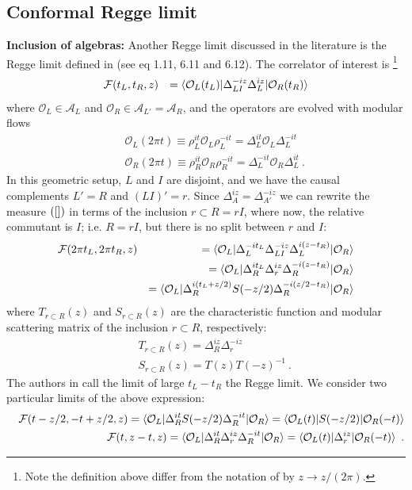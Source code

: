 \documentclass[a4paper,11pt]{article}
\theoremstyle{definition}
\newcommand{\mA}{\mathcal{A}}
\newcommand{\nn}{\nonumber}
\newcommand{\mO}{\mathcal{O}}
\begin{document}
\subsection{Conformal Regge limit}

{\bf Inclusion of algebras:} Another Regge limit discussed in the literature is the Regge limit defined in \cite{chandrasekaran2022scattering} (see eq 1.11, 6.11 and 6.12). The correlator of interest is \footnote{Note the definition above differ from the notation of \cite{chandrasekaran2022scattering} by $z\to z/(2\pi)$.}
\begin{eqnarray}
    \mathcal{F}(t_L,t_R,z)&&=\braket{\mO_L(t_L)|\Delta_{LI}^{-iz}\Delta_L^{iz}|\mO_R(t_R)}
\end{eqnarray}
where $\mO_L\in \mA_L$ and $\mO_R\in \mA_{L'}=\mA_R$, and the operators are evolved with modular flows
\begin{eqnarray}
    &&\mO_L(2\pi t)\equiv \rho_L^{it}\mO_L \rho_L^{-it}=\Delta_L^{it}\mO_L \Delta_L^{-it}\nn\\
    &&\mO_R(2\pi t)\equiv \rho_R^{it}\mO_R \rho_R^{-it}=\Delta_L^{-it}\mO_R \Delta_L^{it}\ .
\end{eqnarray}
In this geometric setup, $L$ and $I$ are disjoint, and we have the causal complements $L'=R$ and $(LI)'=r$. Since $\Delta_A^{iz}=\Delta_{A'}^{-iz}$ we can rewrite the measure $(\ref{})$ in terms of the inclusion $r\subset R=r I$, where now, the relative commutant is $I$; i.e. $R=r I$, but there is no split between $r$ and $I$:
\begin{eqnarray}
    \mathcal{F}(2\pi t_L,2\pi t_R,z)&&=\braket{\mO_L| \Delta_L^{-i t_L}\Delta_{LI}^{-iz}\Delta_L^{i(z-t_R)}|\mO_R}\nn\\
    &&=\braket{\mO_L|\Delta_R^{it_L}\Delta_r^{iz}\Delta_R^{-i(z-t_R)}|\mO_R}\nn\\
    &&=\braket{\mO_L|\Delta_R^{i(t_L+z/2)} S(-z/2)\Delta_R^{-i(z/2-t_R)}|\mO_R}
\end{eqnarray}
where $T_{r\subset R}(z)$ and $S_{r\subset R}(z)$ are the characteristic function and modular scattering matrix of the inclusion $r\subset R$, respectively:
\begin{eqnarray}
    &&T_{r\subset R}(z)=\Delta_R^{iz}\Delta_r^{-iz}\nn\\
    &&S_{r\subset R}(z)=T(z)T(-z)^{-1}\ .
\end{eqnarray}
 The authors in \cite{chandrasekaran2022scattering} call the limit of large $t_L-t_R$ the Regge limit. We consider two particular limits of the above expression:
\begin{eqnarray}\label{cases}
    &&\mathcal{F}(t-z/2,-t+z/2,z)=\braket{\mO_L|\Delta_R^{it}S(-z/2)\Delta_R^{-it}|\mO_R}=\braket{\mO_L(t)|S(-z/2)|\mO_R(-t)}\nn\\
    &&\mathcal{F}(t,z-t,z)=\braket{\mO_L|\Delta_R^{it}\Delta_r^{iz}\Delta_R^{-it}|\mO_R}=\braket{\mO_L(t)|\Delta_r^{iz}|\mO_R(-t)}\ .
\end{eqnarray}
\end{document}
